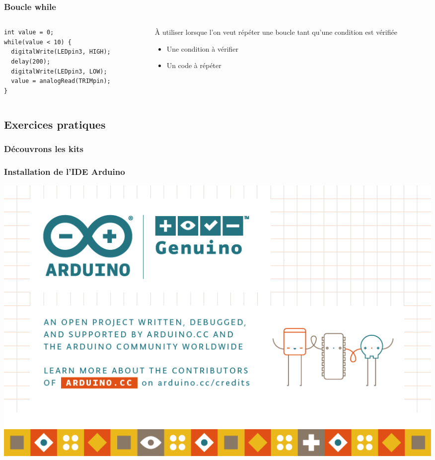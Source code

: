 \documentclass[aspectratio=169,utf8,french]{beamer}
\begin{document}
\begin{frame}[fragile]
  \frametitle{Boucle while}
  \begin{columns}
    \begin{column}{.5\textwidth}
      \begin{lstlisting}
int value = 0;
while(value < 10) {
  digitalWrite(LEDpin3, HIGH);
  delay(200);
  digitalWrite(LEDpin3, LOW);
  value = analogRead(TRIMpin);
}
      \end{lstlisting}
    \end{column}
    \begin{column}{.5\textwidth}
      À utiliser lorsque l’on veut répéter une boucle tant qu’une condition est vérifiée
      \begin{itemize}
        \item Une condition à vérifier
        \item Un code à répéter
      \end{itemize}
    \end{column}
  \end{columns}
\end{frame}

\subsection{Exercices pratiques}

\begin{frame}
  \frametitle{Découvrons les kits}
\end{frame}

\begin{frame}
  \frametitle{Installation de l'IDE Arduino}
  \begin{center}
    \includegraphics[height=.8\textheight]{pictures/arduino.png}
  \end{center}
\end{frame}
\end{document}
